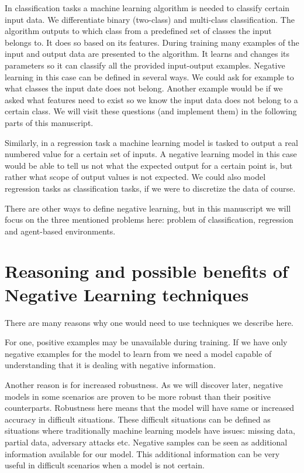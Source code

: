 \documentclass[b5paper]{book}
\begin{document}
In classification tasks a machine learning algorithm is needed to classify certain input data. We differentiate binary (two-class) and multi-class classification. The algorithm outputs to which class from a predefined set of classes the input belongs to. It does so based on its features. During training many examples of the input and output data are presented to the algorithm. It learns and changes its parameters so it can classify all the provided input-output examples. Negative learning in this case can be defined in several ways. We could ask for example to what classes the input date does not belong. Another example would be if we asked what features need to exist so we know the input data does not belong to a certain class. We will visit these questions (and implement them) in the following parts of this manuscript.

Similarly, in a regression task a machine learning model is tasked to output a real numbered value for a certain set of inputs. A negative learning model in this case would be able to tell us not what the expected output for a certain point is, but rather what scope of output values is not expected. We could also model regression tasks as classification tasks, if we were to discretize the data of course.

There are other ways to define negative learning, but in this manuscript we will focus on the three mentioned problems here: problem of classification, regression and agent-based environments.

\section{Reasoning and possible benefits of Negative Learning techniques}

There are many reasons why one would need to use techniques we describe here. 

For one, positive examples may be unavailable during training. If we have only negative examples for the model to learn from we need a model capable of understanding that it is dealing with negative information.

Another reason is for increased robustness. As we will discover later, negative models in some scenarios are proven to be more robust than their positive counterparts. Robustness here means that the model will have same or increased accuracy in difficult situations. These difficult situations can be defined as situations where traditionally machine learning models have issues: missing data, partial data, adversary attacks etc. Negative samples can be seen as additional information available for our model. This additional information can be very useful in difficult scenarios when a model is not certain. 
\end{document}
